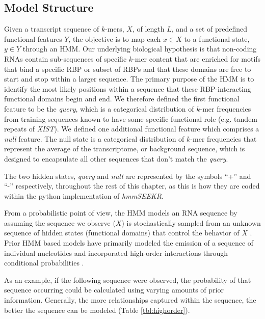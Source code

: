 \subsection{Model Structure}
Given a transcript sequence of $k$-mers, $X$, of length $L$, and a set of predefined functional features $Y$, the objective is to map each $x \in X$ to a functional state, $y \in Y$ through an HMM. Our underlying biological hypothesis is that non-coding RNAs contain sub-sequences of specific $k$-mer content that are enriched for motifs that bind a specific RBP or subset of RBPs and that these domains are free to start and stop within a larger sequence\cite{Brockdorff2018LocalNcRNA,Hezroni2015PrinciplesSpecies,Pang2006RapidFunction}. The primary purpose of the HMM is to identify the most likely positions within a sequence that these RBP-interacting functional domains begin and end. We therefore defined the first functional feature to be the \emph{query}, which is a categorical distribution of $k$-mer frequencies from training sequences known to have some specific functional role (e.g. tandem repeats of \emph{XIST}). We defined one additional functional feature which comprises a \emph{null} feature. The null state is a categorical distribution of $k$-mer frequencies that represent the average of the transcriptome, or background sequence, which is designed to encapsulate all other sequences that don't match the \emph{query}.  

The two hidden states, \textit{query} and \textit{null} are represented by the symbols ``+'' and ``-'' respectively, throughout the rest of this chapter, as this is how they are coded within the python implementation of \emph{hmmSEEKR}. 

From a probabilistic point of view, the HMM models an RNA sequence by assuming the sequence we observe ($X$) is stochastically sampled from an unknown sequence of hidden states (functional domains) that control the behavior of $X$ \cite{Rabiner1989ARecognition}. Prior HMM based models have primarily modeled the emission of a sequence of individual nucleotides and incorporated high-order interactions through conditional probabilities \cite{Burge1997PredictionDNA,Pachter2002ApplicationsProblems,Henderson1997FindingModel}. 

As an example, if the following sequence were observed, the probability of that sequence occurring could be calculated using varying amounts of prior information. Generally, the more relationships captured within the sequence, the better the sequence can be modeled (Table \ref{tbl:highorder}). 

